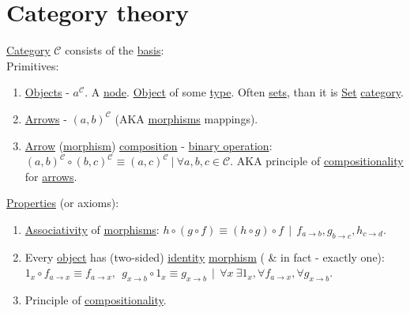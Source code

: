 \documentclass[a4paper,14pt,oneside]{book}
\begin{document}
\chapter{\label{org9dbd3e7}Category theory}
\label{sec:org951a23a}
\hyperref[org841d8bc]{Category} \(\mathcal{C}\) consists of the \hyperref[orge8a5e35]{basis}:\\

Primitives:\\
\begin{enumerate}
\item \hyperref[org22f7883]{Objects} - \(a^{\mathcal{C}}\). A \hyperref[orga5937e3]{node}. \hyperref[org5771609]{Object} of some \hyperref[orgd6db20c]{type}. Often \hyperref[org1faae0f]{sets}, than it is \hyperref[orge119629]{Set} \hyperref[org841d8bc]{category}.\\
\item \hyperref[org516b7ab]{Arrows} - \({(a,b)}^{\mathcal{C}}\) (AKA \hyperref[org9d6b2ec]{morphisms} mappings).\\
\item \hyperref[orga10ccdb]{Arrow} (\hyperref[org2170e98]{morphism}) \hyperref[orgb060001]{composition} - \hyperref[orge2fb74d]{binary operation}: \({(a, b)}^{\mathcal{C}} \circ {(b, c)}^{\mathcal{C}} \equiv {(a, c)}^{\mathcal{C}} \ | \ \forall a, b, c \in \mathcal{C}\). AKA principle of \hyperref[orgee3aef3]{compositionality} for \hyperref[org516b7ab]{arrows}.\\
\end{enumerate}

\hyperref[org1feb373]{Properties} (or axioms):\\
\begin{enumerate}
\item \hyperref[orgc68afc4]{Associativity} of \hyperref[org9d6b2ec]{morphisms}: \({h} \circ ({g} \circ {f}) \equiv ({h} \circ {g}) \circ {f} \ \ | \ \ {f}_{a \to b}, {g}_{b \to c}, {h}_{c \to d}\).\\
\item Every \hyperref[org5771609]{object} has (two-sided) \hyperref[org8140c9c]{identity} \hyperref[org2170e98]{morphism} ( \& in fact - exactly one): \({1}_x \circ {f}_{a \to x} \equiv {f}_{a \to x}, \ \ {g}_{x \to b} \circ {1_x} \equiv {g}_{x \to b } \ \ | \ \ \forall x \ \exists {1}_{x}, \forall {f}_{a \to x},  \forall {g}_{x \to b}\).\\
\item Principle of \hyperref[orgee3aef3]{compositionality}.\\
\end{enumerate}
\end{document}
